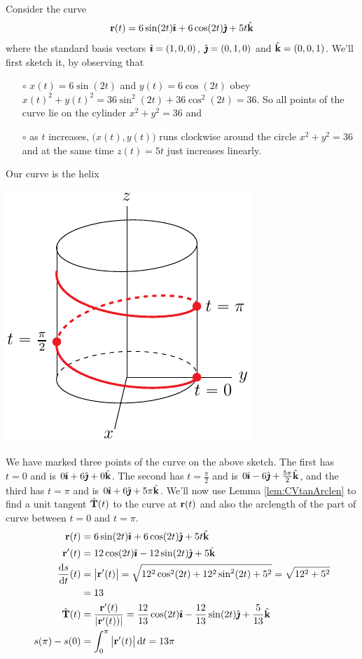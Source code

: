 \begin{eg}\label{eg:paramHelix}
Consider the curve
\begin{equation*}
\mathbf{r}(t) = 6\sin(2t)\hat{\pmb{\imath}} + 6\cos(2t)\hat{\pmb{\jmath}} +5t\hat{\mathbf{k}}
\end{equation*}
where the standard basis vectors $\hat{\pmb{\imath}} = (1,0,0)$, $\hat{\pmb{\jmath}}=(0,1,0)$ 
and $\hat{\mathbf{k}} =(0,0,1)$.
We'll first sketch it, by observing that
\begin{itemize}\itemsep1pt \parskip0pt  %
\item[$\circ$] $x(t)=6\sin(2t)$ and $y(t) =6\cos(2t)$ obey
$x(t)^2+y(t)^2 = 36 \sin^2(2t) + 36\cos^2(2t) = 36$. So all points of the
curve lie on the cylinder $x^2+y^2=36$ and
\item[$\circ$] as $t$ increases, $\big(x(t),y(t)\big)$ runs clockwise 
around the circle $x^2+y^2=36$ and at the same time $z(t) = 5t$ 
just increases linearly.
\end{itemize}
Our curve is the helix
\begin{efig}
\begin{center}
     \includegraphics{helix4.pdf}
\end{center}
\end{efig}
We have marked three points of the curve on the above sketch. The first has
$t=0$ and is $0\hat{\pmb{\imath}}+6\hat{\pmb{\jmath}}+0\hat{\mathbf{k}}$. The second has $t=\frac{\pi}{2}$ and is $0\hat{\pmb{\imath}}-6\hat{\pmb{\jmath}}+\frac{5\pi}{2}\hat{\mathbf{k}}$, and the third has $t=\pi$ and is 
$0\hat{\pmb{\imath}}+6\hat{\pmb{\jmath}}+5\pi\hat{\mathbf{k}}$.
We'll now use Lemma \ref{lem:CVtanArclen} to find a unit tangent
$\hat{\mathbf{T}}(t)$ to the curve at $\mathbf{r}(t)$ and also the arclength of the part of curve between $t=0$ and $t=\pi$.
\begin{align*}
\vr(t) &= 6\sin(2t)\hi + 6\cos(2t)\hj +5t\hk \\
\vr'(t) &= 12\cos(2t)\hi -12\sin(2t)\hj +5\hk \\
\diff{s}{t}(t)&=\big|\vr'(t)\big| 
=\sqrt{12^2\cos^2(2t) +12^2\sin^2(2t)+5^2}
= \sqrt{12^2+5^2} \\
&= 13\\
\hat\vT(t) &= \frac{\vr'(t)}{|\vr'(t))|}
               =  \frac{12}{13}\cos(2t)\hi -\frac{12}{13}\sin(2t)\hj +\frac{5}{13}\hk \\
s(\pi)-s(0)&= \int_{0}^\pi \big|\vr'(t)\big|\,\dee{t}
          =13\pi
\end{align*}
\end{eg}
\goodbreak

